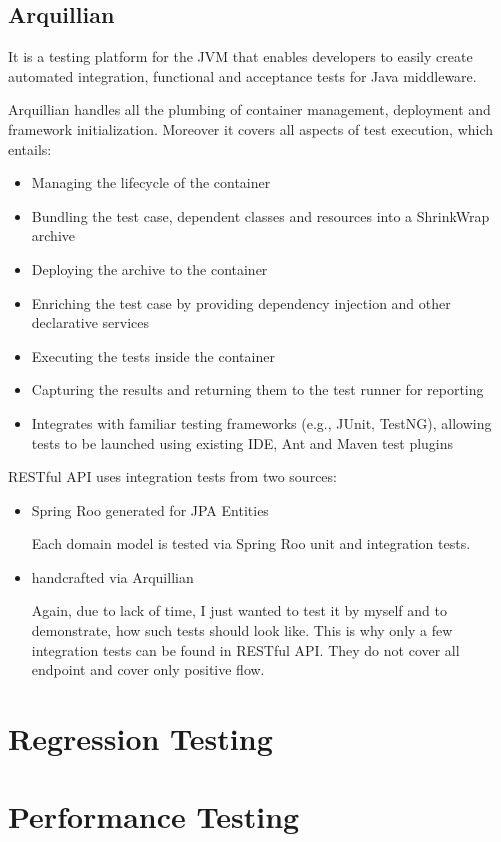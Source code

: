 	\subsection{Arquillian}
	
	It is a testing platform for the JVM that enables developers to easily create automated integration, functional and
	acceptance tests for Java middleware.
	
	Arquillian handles all the plumbing of container management, deployment and framework initialization. Moreover it
	covers all aspects of test execution, which entails:

	\begin{itemize}
		\item Managing the lifecycle of the container
		\item Bundling the test case, dependent classes and resources into a ShrinkWrap archive
		\item Deploying the archive to the container
		\item Enriching the test case by providing dependency injection and other declarative services
		\item Executing the tests inside the container
		\item Capturing the results and returning them to the test runner for reporting
		\item Integrates with familiar testing frameworks (e.g., JUnit, TestNG), allowing tests to be launched using existing
		IDE, Ant and Maven test plugins
	\end{itemize}
	
	RESTful API uses integration tests from two sources:
	
	\begin{itemize}
		\item Spring Roo generated for JPA Entities
		
		Each domain model is tested via Spring Roo unit and integration tests.
		\item handcrafted via Arquillian
		
		Again, due to lack of time, I just wanted to test it by myself and to demonstrate, how such tests should look like.
		This is why only a few integration tests can be found in RESTful API. They do not cover all endpoint and cover only
		positive flow.
	\end{itemize} 

	\section{Regression Testing}

	\section{Performance Testing}